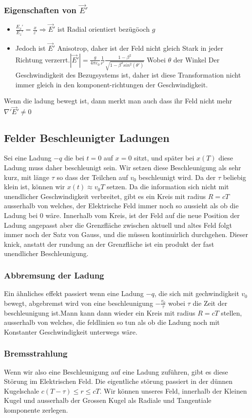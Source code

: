 \documentclass{article}
\begin{document}
\subsubsection*{Eigenschaften von $\vec{E}'$}
\begin{itemize}
  \item{$\frac{E_x'}{E_z'}=\frac{x}{z'}\Longrightarrow\vec{E}'$ ist Radial orientiert bezügöoch $g$}
  \item{Jedoch ist $\vec{E}'$ Anisotrop, daher ist der Feld nicht gleich Stark in jeder Richtung verzerrt.$|\vec{E}'|=\frac{g}{4\pi\varepsilon_0}\frac{1}{r'}\frac{1-\beta^2}{\sqrt{1-\beta^2sin^2(\theta')}}$ Wobei $\theta$ der Winkel
    Der Geschwindigkeit des Bezugsystems ist, daher ist diese Transformation nicht immer gleich in den komponent-richtungen der Geschwindigkeit.}
\end{itemize}
Wenn die ladung bewegt ist, dann merkt man auch dass ihr Feld nicht mehr $\nabla'\vec{E}'\neq 0$
\subsection*{Felder Beschleunigter Ladungen} Sei eine Ladung $-q$ die bei $t=0$ auf $x=0$ sitzt, und später bei $x(T)$ diese Ladung muss daher beschleunigt sein. Wir setzen diese Beschleunigung als sehr kurz, mit länge $\tau$ so dass der Teilchen auf $v_0$ beschleunigt wird. Da der $\tau$ beliebig klein ist, können wir $x(t)\approx v_0 T$ setzen.
Da die information sich nicht mit unendlicher Geschwindigkeit verbreitet, gibt es ein Kreis mit radius $R=cT$ ausserhalb von welches, der Elektrische Feld immer noch so aussieht als ob die Ladung bei $0$ wäre. Innerhalb vom Kreis, ist der Feld auf die neue Position der Ladung angepasst aber die Grenzfläche zwischen aktuell und altes Feld folgt immer noch der Satz von Gauss, und die müssen kontinuirlich durchgehen.
Dieser knick, anstatt der rundung an der Grenzfläche ist ein produkt der fast unendlicher Beschleunigung.
\subsubsection*{Abbremsung der Ladung} Ein ähnliches effekt passiert wenn eine Ladung $-q$, die sich mit gechwindigkeit $v_0$ bewegt, abgebremst wird von eine beschleunigung $-\frac{v_0}{\tau}$ wobei $\tau$ die Zeit der beschleunigung ist.Mann kann dann wieder ein Kreis mit radius $R=cT$ stellen, ausserhalb von welches, die feldlinien so tun als ob die Ladung noch mit Konstanter Geschwindigkeit unterwegs wäre.
\subsubsection*{Bremsstrahlung} Wenn wir also eine Beschleunigung auf eine Ladung zuführen, gibt es diese Störung im Elektrischen Feld. Die eigentliche störung passiert in der dünnen Kugelschale $c(T-\tau)\le r\le cT$. Wir können unseres Feld, innerhalb der Kleinen Kugel und ausserhalb der Grossen Kugel als Radiale und Tangentiale komponente zerlegen.
\end{document}
